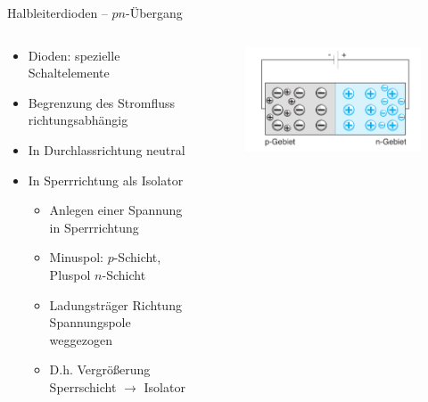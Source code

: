 \documentclass[12pt%
,aspectratio=169%
]{beamer}
\begin{document}
\begin{frame}{Halbleiterdioden -- $pn$-Übergang}
\begin{columns}[T] %
\begin{column}{.48\textwidth}
\begin{itemize}
	\item Dioden: spezielle Schaltelemente
	\item Begrenzung des Stromﬂuss richtungsabhängig
	\item In Durchlassrichtung neutral
	\item In Sperrrichtung als Isolator
	\begin{itemize}
		\item Anlegen einer Spannung in Sperrrichtung
		\item Minuspol: $p$-Schicht, Pluspol $n$-Schicht
		\item Ladungsträger Richtung Spannungspole weggezogen
		\item D.h. Vergrößerung Sperrschicht $\to$ Isolator
	\end{itemize}
\end{itemize}
\end{column}%
\hfill%
\begin{column}{.48\textwidth}
\begin{figure}
\center
\includegraphics[scale=0.5]{pictures/sperrrichtung}
\end{figure}
\end{column}%
\end{columns}
\end{frame}
\end{document}
